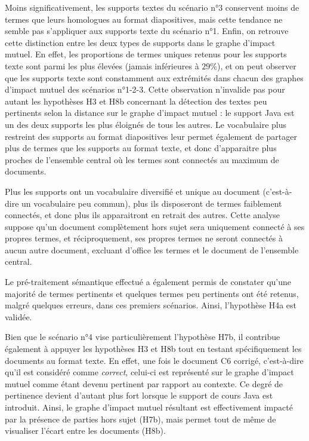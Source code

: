 Moins significativement, les supports textes du scénario n°3 conservent moins de termes que leurs homologues au format diapositives, mais cette tendance ne semble pas s'appliquer aux supports texte du scénario n°1.
Enfin, on retrouve cette distinction entre les deux types de supports dans le graphe d'impact mutuel.
En effet, les proportions de termes uniques retenus pour les supports texte sont parmi les plus élevées (jamais inférieures à $ 29 \% $), et on peut observer que les supports texte sont constamment aux extrémités dans chacun des graphes d'impact mutuel des scénarios n°1-2-3.
Cette observation n'invalide pas pour autant les hypothèses H3 et H8b concernant la détection des textes peu pertinents selon la distance sur le graphe d'impact mutuel : le support Java est un des deux supports les plus éloignés de tous les autres.
Le vocabulaire plus restreint des supports au format diapositives leur permet également de partager plus de termes que les supports au format texte, et donc d'apparaitre plus proches de l'ensemble central où les termes sont connectés au maximum de documents.

Plus les supports ont un vocabulaire diversifié et unique au document (c'est-à-dire un vocabulaire peu commun), plus ils disposeront de termes faiblement connectés, et donc plus ils apparaitront en retrait des autres.
Cette analyse suppose qu'un document complètement hors sujet sera uniquement connecté à ses propres termes, et réciproquement, ses propres termes ne seront connectés à aucun autre document, excluant d'office les termes et le document de l'ensemble central.

Le pré-traitement sémantique effectué a également permis de constater qu'une majorité de termes pertinents et quelques termes peu pertinents ont été retenus, malgré quelques erreurs, dans ces premiers scénarios.
Ainsi, l'hypothèse H4a est validée.

\bigskip

Bien que le scénario n°4 vise particulièrement l'hypothèse H7b, il contribue également à appuyer les hypothèses H3 et H8b tout en testant spécifiquement les documents au format texte.
En effet, une fois le document C6 corrigé, c'est-à-dire qu'il est considéré comme \textit{correct}, celui-ci est représenté sur le graphe d'impact mutuel comme étant devenu pertinent par rapport au contexte.
Ce degré de pertinence devient d'autant plus fort lorsque le support de cours Java est introduit.
Ainsi, le graphe d'impact mutuel résultant est effectivement impacté par la présence de parties hors sujet (H7b), mais permet tout de même de visualiser l'écart entre les documents (H8b).

